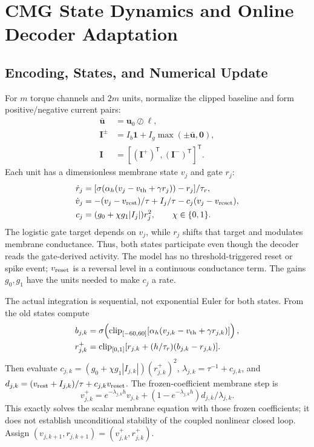 \documentclass[letterpaper,10pt,conference]{IEEEtran}
\newcommand{\T}{^{\mathsf T}}
\newcommand{\clip}{\operatorname{clip}}
\begin{document}
\section{CMG State Dynamics and Online Decoder Adaptation}
\label{sec:architecture}
\subsection{Encoding, States, and Numerical Update}
For $m$ torque channels and $2m$ units, normalize the clipped baseline and
form positive/negative current pairs:
\begin{equation}
 \begin{aligned}
 \bar{\bm u}&=\bm u_0\oslash\bm\ell,\\
 \bm I^{\pm}&=I_b\bm1+I_g\max(\pm\bar{\bm u},\bm0),\\
 \bm I&=[(\bm I^+)\T,(\bm I^-)\T]\T.
 \end{aligned}
 \label{eq:encoding}
\end{equation}
Each unit has a dimensionless membrane state $v_j$ and gate $r_j$:
\begin{align}
 \dot r_j&=[\sigma(\alpha_h(v_j-v_{\rm th}+\gamma r_j))-r_j]/\tau_r,\\
 \dot v_j&=-(v_j-v_{\rm rest})/\tau+I_j/\tau-c_j(v_j-v_{\rm reset}),\\
 c_j&=(g_0+\chi g_1|I_j|)r_j^2,\qquad \chi\in\{0,1\}.
 \label{eq:cmg}
\end{align}
The logistic gate target depends on $v_j$, while $r_j$ shifts that target
and modulates membrane conductance. Thus, both states participate even
though the decoder reads the gate-derived activity. The model has no
threshold-triggered reset or spike event; $v_{\rm reset}$ is a reversal
level in a continuous conductance term. The gains $g_0,g_1$ have the units
needed to make $c_j$ a rate.

The actual integration is sequential, not exponential Euler for both
states. From the old states compute
\begin{align}
 b_{j,k}&=\sigma\!\left(\clip_{[-60,60]}
       [\alpha_h(v_{j,k}-v_{\rm th}+\gamma r_{j,k})]\right),\\
 r_{j,k}^{+}&=\clip_{[0,1]}
       [r_{j,k}+(h/\tau_r)(b_{j,k}-r_{j,k})].
 \label{eq:gate_step}
\end{align}
Then evaluate $c_{j,k}=(g_0+\chi g_1|I_{j,k}|)(r_{j,k}^{+})^2$,
$\lambda_{j,k}=\tau^{-1}+c_{j,k}$, and
$d_{j,k}=(v_{\rm rest}+I_{j,k})/\tau+c_{j,k}v_{\rm reset}$. The
frozen-coefficient membrane step is
\begin{equation}
 v_{j,k}^{+}=e^{-\lambda_{j,k}h}v_{j,k}
       +(1-e^{-\lambda_{j,k}h})d_{j,k}/\lambda_{j,k}.
 \label{eq:mem_step}
\end{equation}
This exactly solves the scalar membrane equation with those frozen
coefficients; it does not establish unconditional stability of the coupled
nonlinear closed loop. Assign $(v_{j,k+1},r_{j,k+1})=(v_{j,k}^{+},r_{j,k}^{+})$.
\end{document}
